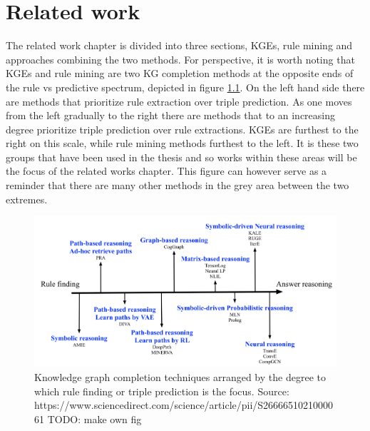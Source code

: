 \chapter{Related work}
\label{related_work}
The related work chapter is divided into three sections, KGEs, rule mining and approaches combining the two methods. For perspective, it is worth noting that KGEs and rule mining are two KG completion methods at the opposite ends of the rule vs predictive spectrum, depicted in figure \ref{scale}. On the left hand side there are methods that prioritize rule extraction over triple prediction. As one moves from the left gradually to the right there are methods that to an increasing degree prioritize triple prediction over rule extractions. KGEs are furthest to the right on this scale, while rule mining methods furthest to the left. It is these two groups that have been used in the thesis and so works within these areas will be the focus of the related works chapter. This figure can however serve as a reminder that there are many other methods in the grey area between the two extremes. 

\begin{figure}[htbp]
\centering
\includegraphics[width=1\linewidth]{figures/related_works/Screenshot.png}
\caption{Knowledge graph completion techniques arranged by the degree to which rule finding or triple prediction is the focus. Source:  https://www.sciencedirect.com/science/article/pii/S2666651021000061   TODO: make own fig}
\label{scale}
\end{figure}


